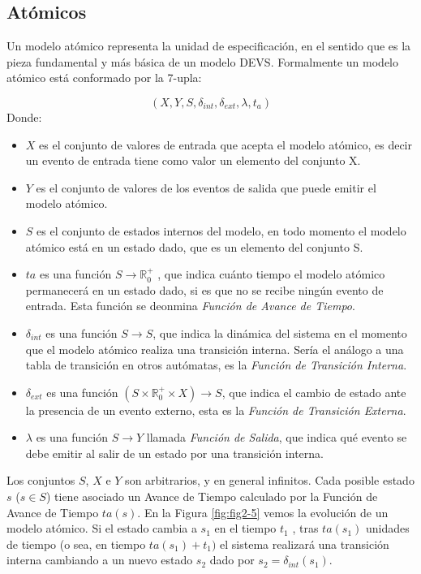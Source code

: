 	\subsection{Atómicos}
	Un modelo atómico representa la unidad  de especificación, en el sentido que es la pieza fundamental y más básica de un modelo DEVS. 
	Formalmente un modelo atómico está conformado por la 7-upla:

	\begin{equation} 
	(X, Y, S, \delta_{int} , \delta_{ext}, \lambda, t_{a}) 
	\end{equation}
Donde:
	\begin{itemize}
	\item $X$ es el conjunto de valores de entrada que acepta el modelo atómico, es decir un evento de entrada tiene como valor un elemento del conjunto X.
	\item $Y$ es el conjunto de valores de los eventos de salida que puede emitir el modelo atómico.
	\item $S$ es el conjunto de estados internos del modelo, en todo momento el modelo atómico está en un estado dado, que es un elemento del conjunto S.
	\item $ta$ es una función $S \to \mathbb{R}^{+}_{0}$ , que indica cuánto tiempo el modelo atómico permanecerá en un estado dado, si es que no se recibe ningún 
	evento de entrada. Esta función se deonmina \emph{Función de Avance de Tiempo}.
	\item $\delta_{int}$ es una función $S \to S$, que indica la dinámica del sistema en el momento que el modelo atómico realiza una transición interna. 
	Sería el análogo a una tabla de transición en otros autómatas, es la \emph{Función de Transición Interna}.
	\item $\delta_{ext}$ es una función $(S \times \mathbb{R}^{+}_{0} \times X) \to S$, que indica el cambio de estado ante la presencia de un evento 
	externo, esta es la \emph{Función de Transición Externa}.
	\item $\lambda$ es una función $S \to Y$ llamada \emph{Función de Salida}, que indica qué evento se debe emitir al salir de un estado por una transición interna. 	\end{itemize}

	Los conjuntos $S$, $X$ e $Y$ son arbitrarios, y en general infinitos. Cada posible estado $s$ ($s \in S$) tiene asociado un Avance de Tiempo calculado 
	por la Función de Avance de Tiempo $ta(s)$.
	En la Figura \ref{fig:fig2-5} vemos la evolución de un modelo atómico. Si el estado cambia a $s_1$ en el tiempo $t_1$ , tras $ta(s_1)$ unidades de 
	tiempo (o sea, en tiempo $ta(s_1 ) + t_1 )$ el sistema realizará una transición interna cambiando a un nuevo estado $s_2$ dado por $s_2 = \delta_{int} (s_1 )$. 

